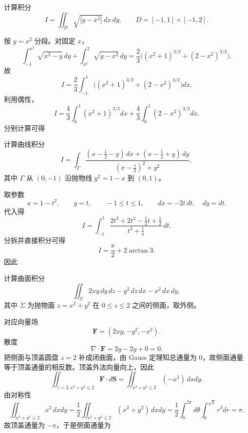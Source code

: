 ﻿


\begin{question}
计算积分
\[
I=\iint_D \sqrt{|y-x^2|}\,dx\,dy,
\qquad D=[-1,1]\times[-1,2].
\]

\begin{solution}

按 $y=x^2$ 分段。对固定 $x$，
\[
\int_{-1}^{x^2}\sqrt{x^2-y}\,dy+\int_{x^2}^{2}\sqrt{y-x^2}\,dy
=\frac23\bigl((x^2+1)^{3/2}+(2-x^2)^{3/2}\bigr).
\]
故
\[
I=\frac23\int_{-1}^{1}\bigl((x^2+1)^{3/2}+(2-x^2)^{3/2}\bigr)dx.
\]
利用偶性，
\[
I=\frac43\int_0^1(x^2+1)^{3/2}dx+\frac43\int_0^1(2-x^2)^{3/2}dx.
\]
分别计算可得
\end{solution}
\end{question}

\begin{question}
计算曲线积分
\[
I=\int_{\Gamma}\frac{(x-\tfrac12-y)\,dx+(x-\tfrac12+y)\,dy}{(x-\tfrac12)^2+y^2},
\]
其中 $\Gamma$ 从 $(0,-1)$ 沿抛物线 $y^2=1-x$ 到 $(0,1)$。
\begin{solution}

取参数
\[
 x=1-t^2,\qquad y=t,\qquad -1\le t\le1,
\qquad dx=-2t\,dt,\quad dy=dt.
\]
代入得
\[
I=\int_{-1}^{1}\frac{2t^3+2t^2-\tfrac12t+\tfrac12}{t^4+\tfrac14}\,dt.
\]
分拆并直接积分可得
\[
I=\frac\pi2+2\arctan 3.
\]
因此
\end{solution}
\end{question}

\begin{question}
计算曲面积分
\[
\iint_{\Sigma}2xy\,dy\,dz-y^2\,dz\,dx-x^2\,dx\,dy,
\]
其中 $\Sigma$ 为抛物面 $z=x^2+y^2$ 在 $0\le z\le2$ 之间的侧面，取外侧。
\begin{solution}

对应向量场
\[
\mathbf F=(2xy,-y^2,-x^2).
\]
散度
\[
\nabla\cdot\mathbf F=2y-2y+0=0.
\]
把侧面与顶盖圆盘 $z=2$ 补成闭曲面，由 Gauss 定理知总通量为 $0$，故侧面通量等于顶盖通量的相反数。顶盖外法向量向上，因此
\[
\iint_{z=2,x^2+y^2\le2}\mathbf F\cdot d\mathbf S=
\iint_{x^2+y^2\le2}(-x^2)\,dxdy.
\]
由对称性
\[
\iint_{x^2+y^2\le2}x^2\,dxdy=\frac12\iint_{x^2+y^2\le2}(x^2+y^2)\,dxdy
=\frac12\int_0^{2\pi}\!d\theta\int_0^{\sqrt2}r^3dr=\pi.
\]
故顶盖通量为 $-\pi$，于是侧面通量为
\end{solution}
\end{question}

